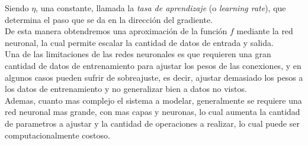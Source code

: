 Siendo $\eta$, una constante, llamada la \textit{tasa de aprendizaje} (o \textit{learning rate}), que determina el paso que se da en la dirección del gradiente. \\

De esta manera obtendremos una aproximación de la función $f$ mediante la red neuronal, la cual permite escalar la cantidad de datos de entrada y salida. \\

Una de las limitaciones de las redes neuronales es que requieren una gran cantidad de datos de entrenamiento para ajustar los pesos de las conexiones, y en algunos casos pueden sufrir de sobreajuste, es decir, ajustar demasiado los pesos a los datos de entrenamiento y no generalizar bien a datos no vistos. \\

Ademas, cuanto mas complejo el sistema a modelar, generalmente se requiere una red neuronal mas grande, con mas capas y neuronas, lo cual aumenta la cantidad de parametros a ajustar y la cantidad de operaciones a realizar, lo cual puede ser computacionalmente costoso. \\

